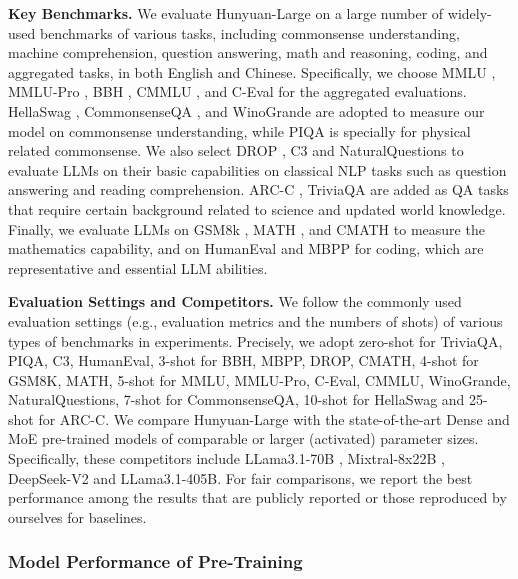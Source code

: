 \documentclass{article}
\begin{document}
\textbf{Key Benchmarks.}
We evaluate Hunyuan-Large on a large number of widely-used benchmarks of various tasks, including commonsense understanding, machine comprehension, question answering, math and reasoning, coding, and aggregated tasks, in both English and Chinese.
Specifically, we choose MMLU \citep{hendrycks2021measuring}, MMLU-Pro \citep{wang2024mmlu-pro}, BBH \citep{suzgun2022challenging}, CMMLU \citep{li2023cmmlu}, and C-Eval \citep{huang2024ceval} for the aggregated evaluations.
HellaSwag \citep{zellers2019hellaswag}, CommonsenseQA \citep{talmor2019commonsenseqa}, and WinoGrande \citep{sakaguchi2021winogrande} are adopted to measure our model on commonsense understanding, while PIQA \citep{bisk2020piqa} is specially for physical related commonsense.
We also select DROP \citep{dua2019drop}, C3 \citep{sun2020investigating} and NaturalQuestions\citep{kwiatkowski2019natural} to evaluate LLMs on their basic capabilities on classical NLP tasks such as question answering and reading comprehension. 
ARC-C \citep{clark2018think}, TriviaQA \citep{joshi2017triviaqa} are added as QA tasks that require certain background related to science and updated world knowledge.
Finally, we evaluate LLMs on GSM8k \citep{cobbe2021training}, MATH \cite{hendrycks2021measuring}, and CMATH \citep{wei2023cmath} to measure the mathematics capability, and on HumanEval \citep{chen2021evaluating} and MBPP \citep{austin2021program} for coding, which are representative and essential LLM abilities.

\textbf{Evaluation Settings and Competitors.}
We follow the commonly used evaluation settings (e.g., evaluation metrics and the numbers of shots) of various types of benchmarks in experiments. Precisely, we adopt zero-shot for TriviaQA, PIQA, C3, HumanEval, 3-shot for BBH, MBPP, DROP, CMATH, 4-shot for GSM8K, MATH, 5-shot for MMLU, MMLU-Pro, C-Eval, CMMLU, WinoGrande, NaturalQuestions, 7-shot for CommonsenseQA, 10-shot for HellaSwag and 25-shot for ARC-C.
We compare Hunyuan-Large with the state-of-the-art Dense and MoE pre-trained models of comparable or larger (activated) parameter sizes. Specifically, these competitors include LLama3.1-70B \citep{dubey2024llama}, Mixtral-8x22B \citep{mistral2024mixtral8x22}, DeepSeek-V2 \citep{deepseek2024v2} and LLama3.1-405B. 
For fair comparisons, we report the best performance among the results that are publicly reported or those reproduced by ourselves for baselines.

\subsubsection{Model Performance of Pre-Training}
\end{document}
